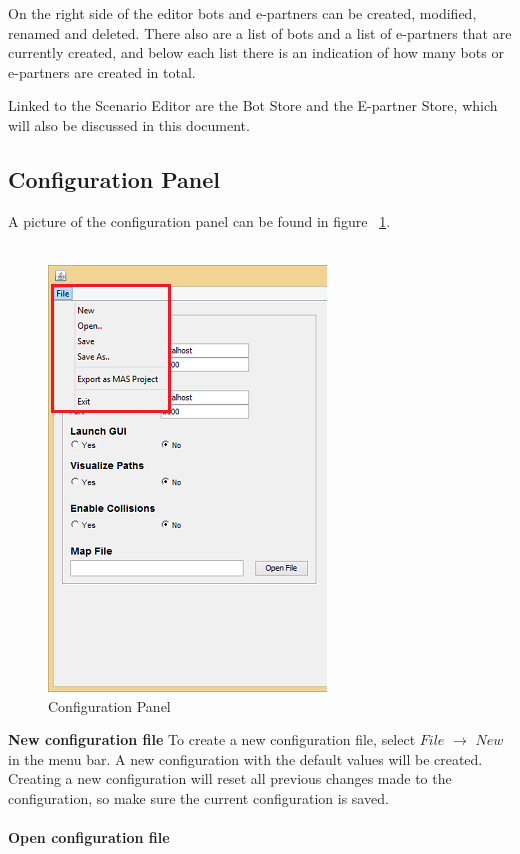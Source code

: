 On the right side of the editor bots and e-partners can be created, modified, renamed and deleted. There also are a list of bots and a list of e-partners that are currently created, and below each list there is an indication of how many bots or e-partners are created in total.

Linked to the Scenario Editor are the Bot Store and the E-partner Store, which will also be discussed in this document.

\subsection{Configuration Panel}
A picture of the configuration panel can be found in figure ~\ref{fig:config}.\\\\
\begin{figure}[h]
\begin{center}
\includegraphics{NewFeatures/config.png}
\end{center}
\caption{Configuration Panel}
\label{fig:config}
\end{figure}
\textbf{New configuration file}
To create a new configuration file, select $File$ $\to$ $New$ in the menu bar. A new configuration with the default values will be created. Creating a new configuration will reset all previous changes made to the configuration, so make sure the current configuration is saved.
\\\\
\textbf{Open configuration file}
